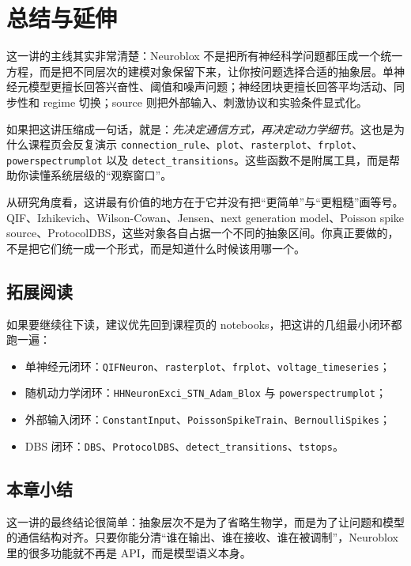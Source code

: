 \documentclass[a4paper]{article}
\begin{document}
\section{总结与延伸}
这一讲的主线其实非常清楚：Neuroblox 不是把所有神经科学问题都压成一个统一方程，而是把不同层次的建模对象保留下来，让你按问题选择合适的抽象层。单神经元模型更擅长回答兴奋性、阈值和噪声问题；神经团块更擅长回答平均活动、同步性和 regime 切换；source 则把外部输入、刺激协议和实验条件显式化。

如果把这讲压缩成一句话，就是：\emph{先决定通信方式，再决定动力学细节}。这也是为什么课程页会反复演示 \texttt{connection\_rule}、\texttt{plot}、\texttt{rasterplot}、\texttt{frplot}、\texttt{powerspectrumplot} 以及 \texttt{detect\_transitions}。这些函数不是附属工具，而是帮助你读懂系统层级的“观察窗口”。

从研究角度看，这讲最有价值的地方在于它并没有把“更简单”与“更粗糙”画等号。QIF、Izhikevich、Wilson-Cowan、Jensen、next generation model、Poisson spike source、ProtocolDBS，这些对象各自占据一个不同的抽象区间。你真正要做的，不是把它们统一成一个形式，而是知道什么时候该用哪一个。

\subsection{拓展阅读}
如果要继续往下读，建议优先回到课程页的 notebooks，把这讲的几组最小闭环都跑一遍：
\begin{itemize}
  \item 单神经元闭环：\texttt{QIFNeuron}、\texttt{rasterplot}、\texttt{frplot}、\texttt{voltage\_timeseries}；
  \item 随机动力学闭环：\texttt{HHNeuronExci\_STN\_Adam\_Blox} 与 \texttt{powerspectrumplot}；
  \item 外部输入闭环：\texttt{ConstantInput}、\texttt{PoissonSpikeTrain}、\texttt{BernoulliSpikes}；
  \item DBS 闭环：\texttt{DBS}、\texttt{ProtocolDBS}、\texttt{detect\_transitions}、\texttt{tstops}。
\end{itemize}

\subsection{本章小结}
这一讲的最终结论很简单：抽象层次不是为了省略生物学，而是为了让问题和模型的通信结构对齐。只要你能分清“谁在输出、谁在接收、谁在被调制”，Neuroblox 里的很多功能就不再是 API，而是模型语义本身。
\end{document}
